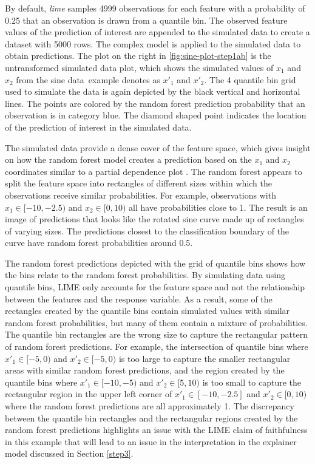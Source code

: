 \documentclass[AMS,STIX2COL]{WileyNJD-v2}\usepackage[]{graphicx}\usepackage[]{color}
\newcommand{\data}{sine data}
\begin{document}
{By default, \emph{lime} samples 4999 observations for each feature with a probability of 0.25 that an observation is drawn from a quantile bin. The observed feature values of the prediction of interest are appended to the simulated data to create a dataset with 5000 rows. The complex model is applied to the simulated data to obtain predictions. The plot on the right in \autoref{fig:sine-plot-step1ab} is the untransformed simulated data plot, which shows the simulated values of $x_1$ and $x_2$ from the \data \ example denotes as $x'_1$ and $x'_2$. The 4 quantile bin grid used to simulate the data is again depicted by the black vertical and horizontal lines. The points are colored by the random forest prediction probability that an observation is in category blue. The diamond shaped point indicates the location of the prediction of interest in the simulated data. 

The simulated data provide a dense cover of the feature space, which gives insight on how the random forest model creates a prediction based on the $x_1$ and $x_2$ coordinates similar to a partial dependence plot \citep{friedman:2001}. The random forest appears to split the feature space into rectangles of different sizes within which the observations receive similar probabilities. For example, observations with $x_1\in[-10,-2.5)$ and $x_2\in[0,10)$ all have probabilities close to 1. The result is an image of predictions that looks like the rotated sine curve made up of rectangles of varying sizes. The predictions closest to the classification boundary of the curve have random forest probabilities around 0.5.

The random forest predictions depicted with the grid of quantile bins shows how the bins relate to the random forest probabilities. By simulating data using quantile bins, LIME only accounts for the feature space and not the relationship between the features and the response variable. As a result, some of the rectangles created by the quantile bins contain simulated values with similar random forest probabilities, but many of them contain a mixture of probabilities. The quantile bin rectangles are the wrong size to capture the rectangular pattern of random forest predictions. For example, the intersection of quantile bins where $x'_1\in[-5 ,0)$ and $x'_2\in[-5,0)$ is too large to capture the smaller rectangular areas with similar random forest predictions, and the region created by the quantile bins where $x'_1\in[-10,-5)$ and $x'_2\in[5,10)$ is too small to capture the rectangular region in the upper left corner of $x'_1\in[-10,-2.5]$ and $x'_2\in[0,10)$ where the random forest predictions are all approximately 1. The discrepancy between the quantile bin rectangles and the rectangular regions created by the random forest predictions highlights an issue with the LIME claim of faithfulness in this example that will lead to an issue in the interpretation in the explainer model discussed in Section \ref{step3}.

}
\end{document}
